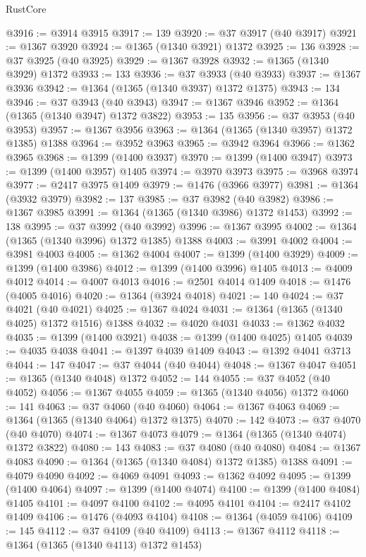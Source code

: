 \begin{lexlean}{RustCore}
\begin{coremodule}
@3916 := @3914 @3915
@3917 := 139
@3920 := @37 @3917 (@40 @3917)
@3921 := @1367 @3920
@3924 := @1365 (@1340 @3921) @1372
@3925 := 136
@3928 := @37 @3925 (@40 @3925)
@3929 := @1367 @3928
@3932 := @1365 (@1340 @3929) @1372
@3933 := 133
@3936 := @37 @3933 (@40 @3933)
@3937 := @1367 @3936
@3942 := @1364 (@1365 (@1340 @3937) @1372 @1375)
@3943 := 134
@3946 := @37 @3943 (@40 @3943)
@3947 := @1367 @3946
@3952 := @1364 (@1365 (@1340 @3947) @1372 @3822)
@3953 := 135
@3956 := @37 @3953 (@40 @3953)
@3957 := @1367 @3956
@3963 := @1364 (@1365 (@1340 @3957) @1372 @1385) @1388
@3964 := @3952 @3963
@3965 := @3942 @3964
@3966 := @1362 @3965
@3968 := @1399 (@1400 @3937)
@3970 := @1399 (@1400 @3947)
@3973 := @1399 (@1400 @3957) @1405
@3974 := @3970 @3973
@3975 := @3968 @3974
@3977 := @2417 @3975 @1409
@3979 := @1476 (@3966 @3977)
@3981 := @1364 (@3932 @3979)
@3982 := 137
@3985 := @37 @3982 (@40 @3982)
@3986 := @1367 @3985
@3991 := @1364 (@1365 (@1340 @3986) @1372 @1453)
@3992 := 138
@3995 := @37 @3992 (@40 @3992)
@3996 := @1367 @3995
@4002 := @1364 (@1365 (@1340 @3996) @1372 @1385) @1388
@4003 := @3991 @4002
@4004 := @3981 @4003
@4005 := @1362 @4004
@4007 := @1399 (@1400 @3929)
@4009 := @1399 (@1400 @3986)
@4012 := @1399 (@1400 @3996) @1405
@4013 := @4009 @4012
@4014 := @4007 @4013
@4016 := @2501 @4014 @1409
@4018 := @1476 (@4005 @4016)
@4020 := @1364 (@3924 @4018)
@4021 := 140
@4024 := @37 @4021 (@40 @4021)
@4025 := @1367 @4024
@4031 := @1364 (@1365 (@1340 @4025) @1372 @1516) @1388
@4032 := @4020 @4031
@4033 := @1362 @4032
@4035 := @1399 (@1400 @3921)
@4038 := @1399 (@1400 @4025) @1405
@4039 := @4035 @4038
@4041 := @1397 @4039 @1409
@4043 := @1392 @4041 @3713
@4044 := 147
@4047 := @37 @4044 (@40 @4044)
@4048 := @1367 @4047
@4051 := @1365 (@1340 @4048) @1372
@4052 := 144
@4055 := @37 @4052 (@40 @4052)
@4056 := @1367 @4055
@4059 := @1365 (@1340 @4056) @1372
@4060 := 141
@4063 := @37 @4060 (@40 @4060)
@4064 := @1367 @4063
@4069 := @1364 (@1365 (@1340 @4064) @1372 @1375)
@4070 := 142
@4073 := @37 @4070 (@40 @4070)
@4074 := @1367 @4073
@4079 := @1364 (@1365 (@1340 @4074) @1372 @3822)
@4080 := 143
@4083 := @37 @4080 (@40 @4080)
@4084 := @1367 @4083
@4090 := @1364 (@1365 (@1340 @4084) @1372 @1385) @1388
@4091 := @4079 @4090
@4092 := @4069 @4091
@4093 := @1362 @4092
@4095 := @1399 (@1400 @4064)
@4097 := @1399 (@1400 @4074)
@4100 := @1399 (@1400 @4084) @1405
@4101 := @4097 @4100
@4102 := @4095 @4101
@4104 := @2417 @4102 @1409
@4106 := @1476 (@4093 @4104)
@4108 := @1364 (@4059 @4106)
@4109 := 145
@4112 := @37 @4109 (@40 @4109)
@4113 := @1367 @4112
@4118 := @1364 (@1365 (@1340 @4113) @1372 @1453)

\end{coremodule}
\end{lexlean}
